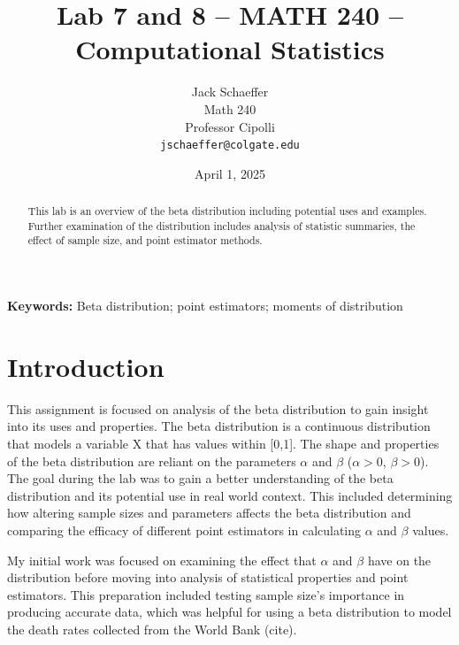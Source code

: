 \documentclass{article}\usepackage[]{graphicx}\usepackage[]{xcolor}
\begin{document}
\vspace{-1in}
\title{Lab 7 and 8 -- MATH 240 -- Computational Statistics}

\author{
  Jack Schaeffer \\
  Math 240  \\
  Professor Cipolli  \\
  {\tt jschaeffer@colgate.edu}
}

\date{April 1, 2025}

\maketitle

\begin{multicols}{2}
\begin{abstract}
This lab is an overview of the beta distribution including potential uses and examples. Further examination of the distribution includes analysis of statistic summaries, the effect of sample size, and point estimator methods.
\end{abstract}

\noindent \textbf{Keywords:} Beta distribution; point estimators; moments of distribution

\section{Introduction}

This assignment is focused on analysis of the beta distribution to gain insight into its uses and properties. The beta distribution is a continuous distribution that models a variable X that has values within [0,1]. The shape and properties of the beta distribution are reliant on the parameters $\alpha$ and $\beta$ ($\alpha>0$, $\beta>0$). The goal during the lab was to gain a better understanding of the beta distribution and its potential use in real world context. This included determining how altering sample sizes and parameters affects the beta distribution and comparing the efficacy of different point estimators in calculating $\alpha$ and $\beta$ values.

My initial work was focused on examining the effect that $\alpha$ and $\beta$ have on the distribution before moving into analysis of statistical properties and point estimators. This preparation included testing sample size's importance in producing accurate data, which was helpful for using a beta distribution to model the death rates collected from the World Bank (cite).


\end{multicols}
\end{document}
